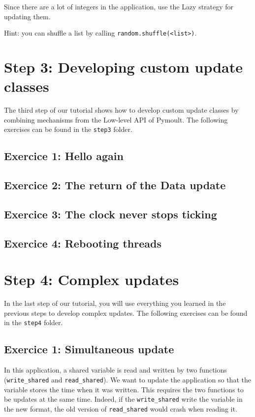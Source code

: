 \documentclass{article}
\begin{document}
Since there are a lot of integers in the application, use the Lazy
strategy for updating them.

Hint: you can shuffle a list by calling \texttt{random.shuffle(<list>)}.

\section{Step 3: Developing custom update classes}

The third step of our tutorial shows how to develop custom update
classes by combining mechanisms from the Low-level API of Pymoult. The
following exercises can be found in the \texttt{step3} folder.

\subsection{Exercice 1: Hello again}

\subsection{Exercice 2: The return of the Data update}

\subsection{Exercice 3: The clock never stops ticking}

\subsection{Exercice 4: Rebooting threads}


\section{Step 4: Complex updates}

In the last step of our tutorial, you will use everything you learned
in the previous steps to develop complex updates. The
following exercises can be found in the \texttt{step4} folder.

\subsection{Exercice 1: Simultaneous update}

In this application, a shared variable is read and written by two
functions (\texttt{write\_shared} and \texttt{read\_shared}). We want
to update the application so that the variable stores the time when it
was written. This requires the two functions to be updates at the same
time. Indeed, if the \texttt{write\_shared} write the variable in the
new format, the old version of \texttt{read\_shared} would crash when
reading it.
\end{document}
